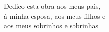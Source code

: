 \begin{dedicatoria}
Dedico esta obra aos meus pais,\\
à minha esposa, aos meus filhos e\\
aos meus sobrinhos e sobrinhas
\end{dedicatoria}